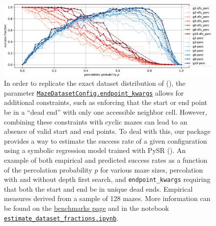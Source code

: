 \begin{figure}
	\centering
	\includegraphics[width=1\textwidth,height=\textheight]{figures/ep/ep_deadends_unique-crop.pdf}
	\caption{
		In order to replicate the exact dataset distribution of (), %
		the parameter 
		\href{https://understanding-search.github.io/maze-dataset/maze_dataset/dataset/maze_dataset_config.html\#MazeDatasetConfig.endpoint_kwargs}{\texttt{MazeDatasetConfig.endpoint\_kwargs}}
		allows for additional constraints, such as enforcing that the start or end point be in a ``dead end'' with only one accessible neighbor cell. However, combining these constraints with cyclic mazes can lead to an absence of valid start and end points. To deal with this, our package provides a way to estimate the success rate of a given configuration using a symbolic regression model trained with PySR (). %
		An example of both empirical and predicted success rates as a function of the percolation probability \(p\) for various maze sizes, percolation with and without depth first search, and \texttt{endpoint\_kwargs} requiring that both the start and end be in unique dead ends. Empirical measures derived from a sample of 128 mazes. More information can be found on the \href{https://understanding-search.github.io/maze-dataset/benchmarks/}{benchmarks page} and in the notebook 
		\href{https://understanding-search.github.io/maze-dataset/notebooks/estimate_dataset_fractions.html}{\texttt{estimate\_dataset\_fractions.ipynb}}.
	}
	\label{fig:sre}
\end{figure}